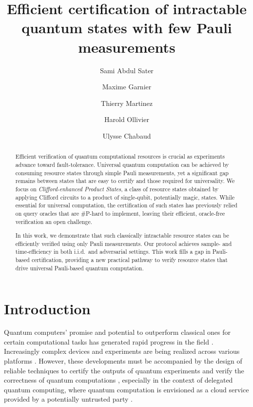 \documentclass[a4paper,twocolumn,11pt,unpublished]{quantumarticle}
\title{Efficient certification of intractable quantum states with few Pauli measurements}
\author{Sami Abdul Sater}
\author{Maxime Garnier}
\author{Thierry Martinez}
\author{Harold Ollivier}
\author{Ulysse Chabaud}
\affiliation{INRIA, DIENS, Ecole Normale Supérieure, PSL University, CNRS, 45 rue d’Ulm, Paris 75005, France}
\begin{document}
\begin{abstract}
Efficient verification of quantum computational resources is crucial as experiments advance toward fault-tolerance. Universal quantum computation can be achieved by consuming resource states through simple Pauli measurements, yet a significant gap remains between states that are easy to certify and those required for universality. We focus on \emph{Clifford-enhanced Product States}, a class of resource states obtained by applying Clifford circuits to a product of single-qubit, potentially magic, states. While essential for universal computation, the certification of such states has previously relied on query oracles that are \#P-hard to implement, leaving their efficient, oracle-free verification an open challenge.

In this work, we demonstrate that such classically intractable resource states can be efficiently verified using only Pauli measurements. 
Our protocol achieves sample- and time-efficiency in both i.i.d.\ and adversarial settings.
This work fills a gap in Pauli-based certification, providing a new practical pathway to verify resource states that drive universal Pauli-based quantum computation.
\end{abstract}


\maketitle


\section{Introduction}

Quantum computers' promise and potential to outperform classical ones for certain computational tasks
\cite{S94algorithms, G96fast, F82simulating, F86quantum, D85quantum, HCMP25vast}
has generated rapid progress in the field \cite{P18quantum, EP25mind}.
Increasingly complex devices and experiments are being realized across various platforms
\cite{NLDC22beating, AAAA25constructive, DBMA25breaking}.
However, these developments must be accompanied by the design of reliable techniques to
{certify the outputs of quantum experiments} and {verify the correctness of quantum computations}
\cite{EHWR20quantum, BPY25quantum, PYBB24benchmarking}, especially in the context of delegated quantum computing,
where quantum computation is envisioned as a cloud service provided by a potentially untrusted party
\cite{GKK19verification}.
\end{document}
